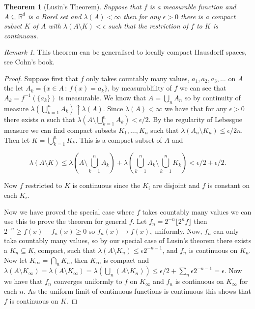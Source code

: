 \documentclass[
]{book}
\newtheorem{theorem}{Theorem}[chapter]
\theoremstyle{definition}
\theoremstyle{definition}
\theoremstyle{definition}
\theoremstyle{definition}
\theoremstyle{remark}
\newtheorem*{remark}{Remark}
\begin{document}
\begin{theorem}[Lusin's Theorem]
Suppose that \(f\) is a measurable function and \(A \subseteq \mathbb{R}^d\) is a Borel set and \(\lambda(A) < \infty\) then for any \(\epsilon >0\) there is a compact subset \(K\) of \(A\) with \(\lambda(A \setminus K) < \epsilon\) such that the restriction of \(f\) to \(K\) is continuous.
\end{theorem}

\begin{remark}
This theorem can be generalised to locally compact Hausdorff spaces, see Cohn's book.
\end{remark}

\begin{proof}
Suppose first that \(f\) only takes countably many values, \(a_1, a_2, a_3, \dots\) on \(A\) the let \(A_k = \{ x \in A \,:\, f(x) = a_k\}\), by measurablility of \(f\) we can see that \(A_k = f^{-1}(\{a_k\})\) is measurable. We know that \(A = \bigcup_n A_n\) so by continuity of measure \(\lambda(\bigcup_{k=1}^n A_k) \uparrow \lambda(A)\). Since \(\lambda(A) < \infty\) we have that for any \(\epsilon >0\) there exists \(n\) such that \(\lambda(A \setminus \bigcup_{k=1}^n A_k) < \epsilon/2\). By the regularity of Lebesgue measure we can find compact subsets \(K_1, \dots, K_n\) such that \(\lambda(A_n \setminus K_n) \leq \epsilon/2n\). Then let \(K = \bigcup_{k=1}^n K_k\). This is a compact subset of \(A\) and

\[ \lambda(A \setminus K) \leq \lambda(A\setminus \bigcup_{k=1}^n A_k) + \lambda(\bigcup_{k=1}^n A_k \setminus \bigcup_{k=1}^n K_k ) < \epsilon/2 + \epsilon/2. \]

Now \(f\) restricted to \(K\) is continuous since the \(K_i\) are disjoint and \(f\) is constant on each \(K_i\).

Now we have proved the special case where \(f\) takes countably many values we can use this to prove the theorem for general \(f\). Let \(f_n = 2^{-n} \lfloor 2^n f \rfloor\) then \(2^{-n} \geq f(x)-f_n(x) \geq 0\) so \(f_n(x) \rightarrow f(x)\), uniformly. Now, \(f_n\) can only take countably many values, so by our special case of Lusin's theorem there exists a \(K_n \subseteq K\), compact, such that \(\lambda(A \setminus K_n) \leq \epsilon 2^{-n-1}\), and \(f_n\) is continuous on \(K_n\). Now let \(K_\infty = \bigcap_n K_n\), then \(K_\infty\) is compact and \(\lambda(A \setminus K_\infty) = \lambda(A \setminus K_\infty) = \lambda (\bigcup_n(A \setminus K_n)) \leq \epsilon/2 + \sum_n \epsilon 2^{-n-1} = \epsilon\). Now we have that \(f_n\) converges uniformly to \(f\) on \(K_\infty\) and \(f_n\) is continuous on \(K_\infty\) for each \(n\). As the uniform limit of continuous functions is continuous this shows that \(f\) is continuous on \(K\).
\end{proof}
\end{document}
